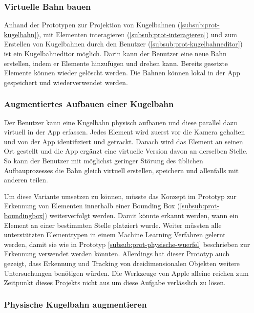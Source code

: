 \subsubsection{Virtuelle Bahn bauen}\label{subsub:loesung-virtuelle-bahn}

Anhand der Prototypen zur Projektion von Kugelbahnen (\ref{subsub:prot-kugelbahn}), mit Elementen interagieren (\ref{subsub:prot-interagieren}) und zum Erstellen von Kugelbahnen durch den Benutzer (\ref{subsub:prot-kugelbahneditor}) ist ein Kugelbahneditor möglich.
Darin kann der Benutzer eine neue Bahn erstellen, indem er Elemente hinzufügen und drehen kann.
Bereits gesetzte Elemente können wieder gelöscht werden.
Die Bahnen können lokal in der App gespeichert und wiederverwendet werden.

\subsubsection{Augmentiertes Aufbauen einer Kugelbahn}\label{subsub:loesung-augmentiertes-aufbauen}

Der Benutzer kann eine Kugelbahn physisch aufbauen und diese parallel dazu virtuell in der App erfassen.
Jedes Element wird zuerst vor die Kamera gehalten und von der App identifiziert und getrackt.
Danach wird das Element an seinen Ort gestellt und die App ergänzt eine virtuelle Version davon an derselben Stelle.
So kann der Benutzer mit möglichst geringer Störung des üblichen Aufbauprozesses die Bahn gleich virtuell erstellen, speichern und allenfalls mit anderen teilen.

Um diese Variante umsetzen zu können, müsste das Konzept im Prototyp zur Erkennung von Elementen innerhalb einer Bounding Box (\ref{subsub:prot-boundingbox}) weiterverfolgt werden.
Damit könnte erkannt werden, wann ein Element an einer bestimmten Stelle platziert wurde.
Weiter müssten alle unterstützten Elementtypen in einem Machine Learning Verfahren gelernt werden, damit sie wie in Prototyp \ref{subsub:prot-physische-wuerfel} beschrieben zur Erkennung verwendet werden könnten.
Allerdings hat dieser Prototyp auch gezeigt, dass Erkennung und Tracking von dreidimensionalen Objekten weitere Untersuchungen benötigen würden.
Die Werkzeuge von Apple alleine reichen zum Zeitpunkt dieses Projekts nicht aus um diese Aufgabe verlässlich zu lösen.

\subsubsection{Physische Kugelbahn augmentieren}

